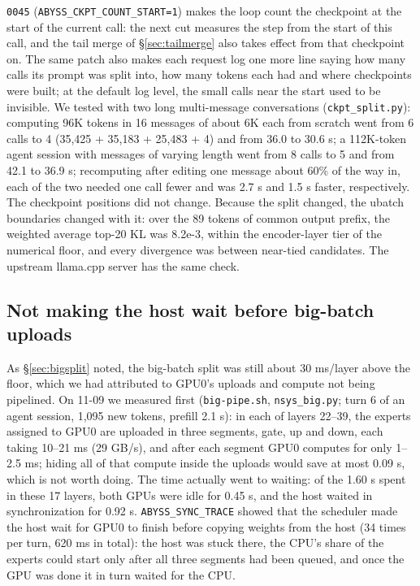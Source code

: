\documentclass[11pt,a4paper]{article}
\newcommand{\code}[1]{\texttt{#1}}
\begin{document}
\code{0045} (\code{ABYSS\_CKPT\_COUNT\_START=1}) makes the loop count the checkpoint at the start of the current call: the next cut measures the step from the start of this call, and the tail merge of \S\ref{sec:tailmerge} also takes effect from that checkpoint on. The same patch also makes each request log one more line saying how many calls its prompt was split into, how many tokens each had and where checkpoints were built; at the default log level, the small calls near the start used to be invisible. We tested with two long multi-message conversations (\code{ckpt\_split.py}): computing 96K tokens in 16 messages of about 6K each from scratch went from 6 calls to 4 (35,425 + 35,183 + 25,483 + 4) and from 36.0 to 30.6 s; a 112K-token agent session with messages of varying length went from 8 calls to 5 and from 42.1 to 36.9 s; recomputing after editing one message about 60\% of the way in, each of the two needed one call fewer and was 2.7 s and 1.5 s faster, respectively. The checkpoint positions did not change. Because the split changed, the ubatch boundaries changed with it: over the 89 tokens of common output prefix, the weighted average top-20 KL was 8.2e-3, within the encoder-layer tier of the numerical floor, and every divergence was between near-tied candidates. The upstream llama.cpp server has the same check.

\subsection{Not making the host wait before big-batch uploads}
\label{sec:nowait}

As \S\ref{sec:bigsplit} noted, the big-batch split was still about 30 ms/layer above the floor, which we had attributed to GPU0's uploads and compute not being pipelined. On 11-09 we measured first (\code{big-pipe.sh}, \code{nsys\_big.py}; turn 6 of an agent session, 1,095 new tokens, prefill 2.1 s): in each of layers 22--39, the experts assigned to GPU0 are uploaded in three segments, gate, up and down, each taking 10--21 ms (29 GB/s), and after each segment GPU0 computes for only 1--2.5 ms; hiding all of that compute inside the uploads would save at most 0.09 s, which is not worth doing. The time actually went to waiting: of the 1.60 s spent in these 17 layers, both GPUs were idle for 0.45 s, and the host waited in synchronization for 0.92 s. \code{ABYSS\_SYNC\_TRACE} showed that the scheduler made the host wait for GPU0 to finish before copying weights from the host (34 times per turn, 620 ms in total): the host was stuck there, the CPU's share of the experts could start only after all three segments had been queued, and once the GPU was done it in turn waited for the CPU.
\end{document}
